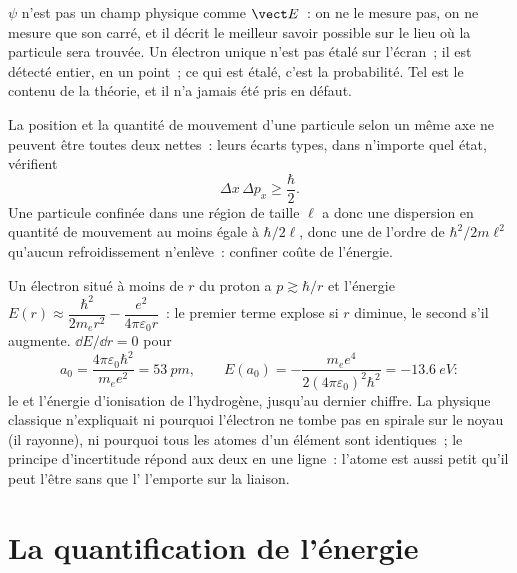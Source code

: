 \begin{remark}\label{rem:b1:quantum-introduction:whatwaves}
$\psi$ n'est pas un champ physique comme $\vect E$~: on ne le mesure pas,
on ne mesure que son carré, et il décrit le meilleur savoir possible sur
le lieu où la particule sera trouvée. Un électron unique n'est pas étalé
sur l'écran~; il est détecté entier, en un point~; ce qui est étalé, c'est
la probabilité. Tel est le contenu de la théorie, et il n'a jamais été
pris en défaut.
\end{remark}

\begin{theorem}\label{thm:b1:quantum-introduction:heisenberg}
La position et la quantité de mouvement d'une particule selon un même axe
ne peuvent être toutes deux nettes~: leurs écarts types, dans n'importe
quel état, vérifient
\[
\Delta x\,\Delta p_x \geq \frac{\hbar}{2} .
\]
Une particule confinée dans une région de taille $\ell$ a donc une
dispersion en quantité de mouvement au moins égale à $\hbar/2\ell$, donc une
 de l'ordre de $\hbar^2/2m\ell^2$ qu'aucun refroidissement
n'enlève~: confiner coûte de l'énergie.
\end{theorem}
\admitted

\begin{example}\label{ex:b1:quantum-introduction:hsize}
Un électron situé à moins de $r$ du proton a $p \gtrsim \hbar/r$ et l'énergie
$E(r) \approx \dfrac{\hbar^2}{2m_er^2} - \dfrac{e^2}{4\pi\varepsilon_0r}$~: le premier
terme explose si $r$ diminue, le second s'il augmente. $\dd E/\dd r = 0$ pour
\[
a_0 = \frac{4\pi\varepsilon_0\hbar^2}{m_ee^2} = \qty{53}{pm} , \qquad
E(a_0) = -\frac{m_ee^4}{2(4\pi\varepsilon_0)^2\hbar^2} = \qty{-13.6}{eV} :
\]
le \emph{} et l'énergie d'ionisation de l'hydrogène, jusqu'au
dernier chiffre. La physique classique n'expliquait ni pourquoi l'électron
ne tombe pas en spirale sur le noyau (il rayonne), ni pourquoi tous les
atomes d'un élément sont identiques~; le principe d'incertitude répond aux
deux en une ligne~: l'atome est aussi petit qu'il peut l'être sans que
l' l'emporte sur la liaison.
\end{example}

\section{La quantification de l'énergie}

